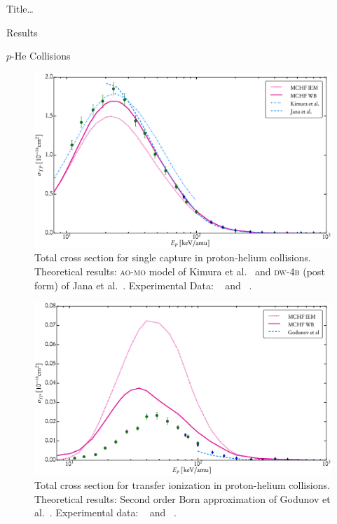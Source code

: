 \documentclass[letterpaper, 11 pt]{report}
\begin{document}
\begin{chapter}{ Title\dots \label{chap:p-he2p-he}}
\begin{section}{Results \label{sec:phe2p-res}}
\begin{subsection}{\texorpdfstring{$p$}{p}-He Collisions \label{sec:phe-res}}
         \begin{figure}[t]
            \centering
            \includegraphics[width = 0.95 \linewidth]{./images/phe/phe-TP.eps}
            \caption[Total cross section for single capture in proton-helium collisions.]
                    {Total cross section for single capture in proton-helium collisions.
                     Theoretical results: \textsc{ao-mo} model of Kimura et al.~\cite{KL-86} and
                     \textsc{dw-4b} (post form) of Jana et al.~\cite{JMP-15}. Experimental Data:
                     {\color{OliveGreen}{$\bullet$}}~\cite{SG89} and
                     {\color{blue}{$\blacklozenge$}}~\cite{SG85}. \label{fig:phe-tp}}
         \end{figure}

         \begin{figure}[t]
            \centering
            \includegraphics[width = 0.95 \linewidth]{./images/phe/phe-IP.eps}
            \caption[Total cross section for transfer ionization in proton-helium collisions.]
                    {Total cross section for transfer ionization in proton-helium collisions.
                     Theoretical results: Second order Born approximation of Godunov
                     et al.~\cite{Godunov-06}. Experimental data:
                     {\color{OliveGreen}{$\bullet$}}~\cite{SG89} and
                     {\color{blue}{$\blacklozenge$}}~\cite{SG85}. \label{fig:phe-ip}}
         \end{figure}


\end{subsection}
\end{section}
\end{chapter}
\end{document}

